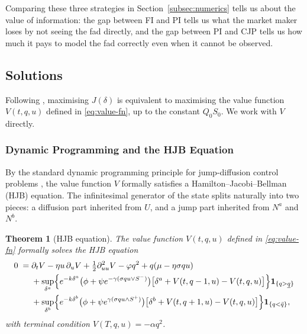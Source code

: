 \documentclass[11pt,a4paper]{article}
\theoremstyle{plain}
\newtheorem{theorem}{Theorem}[section]
\theoremstyle{definition}
\begin{document}
Comparing these three strategies in Section~\ref{subsec:numerics} tells
us about the value of information: the gap between FI and PI tells us
what the market maker loses by not seeing the fad directly, and the gap
between PI and CJP tells us how much it pays to model the fad correctly
even when it cannot be observed.

\subsection{Solutions}
\label{subsec:solutions}

Following \cite{barucci2025market}, maximising $J(\delta)$ is equivalent to
maximising the value function $V(t,q,u)$ defined in \eqref{eq:value-fn},
up to the constant $Q_0 S_0$. We work with $V$ directly.

\subsubsection{Dynamic Programming and the HJB Equation}

By the standard dynamic programming principle for jump-diffusion control
problems \cite[Ch.\ 5]{shreve2004stochastic}, the value function $V$
formally satisfies a Hamilton--Jacobi--Bellman (HJB) equation. The
infinitesimal generator of the state splits naturally into two pieces: a
diffusion part inherited from $U$, and a jump part inherited from $N^a$
and $N^b$.

\begin{theorem}[HJB equation]
\label{thm:hjb}
The value function $V(t,q,u)$ defined in \eqref{eq:value-fn} formally
solves the HJB equation
\begin{equation}
\label{eq:hjb}
\begin{aligned}
  0 \;=\;& \partial_t V - \eta u\,\partial_u V
    + \tfrac{1}{2}\partial^2_{uu}V
    - \varphi q^2 + q(\mu - \eta\sigma q u)\\
   &+ \sup_{\delta^a}\Bigl\{
        e^{-k\delta^a}\bigl(\phi + \psi e^{-\gamma(\sigma q u\vee S^-)}\bigr)
        \bigl[\delta^a + V(t,q-1,u) - V(t,q,u)\bigr]\Bigr\}
        \mathbf{1}_{\{q>\underline{q}\}}\\
   &+ \sup_{\delta^b}\Bigl\{
        e^{-k\delta^b}\bigl(\phi + \psi e^{\gamma(\sigma q u\wedge S^+)}\bigr)
        \bigl[\delta^b + V(t,q+1,u) - V(t,q,u)\bigr]\Bigr\}
        \mathbf{1}_{\{q<\bar{q}\}},
\end{aligned}
\end{equation}
with terminal condition $V(T,q,u) = -\alpha q^2$.
\end{theorem}
\end{document}
